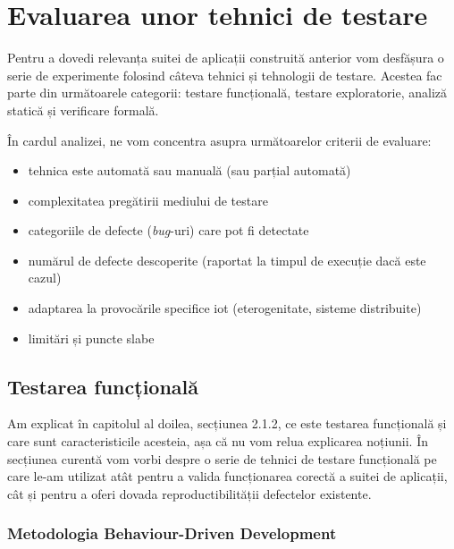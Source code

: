 \chapter{Evaluarea unor tehnici de testare}

Pentru a dovedi relevanța suitei de aplicații construită anterior vom desfășura o serie de experimente folosind câteva tehnici și tehnologii de testare. Acestea fac parte din următoarele categorii: testare funcțională, testare exploratorie, analiză statică și verificare formală.

În cardul analizei, ne vom concentra asupra următoarelor criterii de evaluare:

\begin{itemize}
    \item tehnica este automată sau manuală (sau parțial automată)
    \item complexitatea pregătirii mediului de testare
    \item categoriile de defecte (\textit{bug}-uri) care pot fi detectate
    \item numărul de defecte descoperite (raportat la timpul de execuție dacă este cazul)
    \item adaptarea la provocările specifice \acrshort{iot} (eterogenitate, sisteme distribuite)
    \item limitări și puncte slabe
\end{itemize} 

\section{Testarea funcțională}

Am explicat în capitolul al doilea, secțiunea 2.1.2, ce este testarea funcțională și care sunt caracteristicile acesteia, așa că nu vom relua explicarea noțiunii. În secțiunea curentă vom vorbi despre o serie de tehnici de testare funcțională pe care le-am utilizat atât pentru a valida funcționarea corectă a suitei de aplicații, cât și pentru a oferi dovada reproductibilității defectelor existente.


\subsection{Metodologia Behaviour-Driven Development}
\label{cap:testare_bdd}


